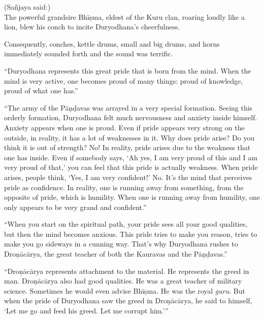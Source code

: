 {\hspace*{1em}(Sañjaya said:) \\
The powerful grandsire Bhīṣma, eldest of the Kuru clan, roaring loudly like a lion, blew his conch to incite Duryodhana's cheerfulness.}

{Consequently, conches, kettle drums, small and big drums, and horns immediately sounded forth and the sound was terrific.}


\enquote{Duryodhana represents this great pride that is born from the mind. When the mind is very active, one becomes proud of many things: proud of knowledge, proud of what one has.}

\enquote{The army of the Pāṇḍavas was arrayed in a very special formation. Seeing this orderly formation, Duryodhana felt much nervousness and anxiety inside himself. Anxiety appears when one is proud. Even if pride appears very strong on the outside, in reality, it has a lot of weaknesses in it. Why does pride arise? Do you think it is out of strength? No! In reality, pride arises due to the weakness that one has inside. Even if somebody says, \enquote{Ah yes, I am very proud of this and I am very proud of that,} you can feel that this pride is actually weakness. When pride arises, people think, \enquote{Yes, I am very confident!} No. It’s the mind that perceives pride as confidence. In reality, one is running away from something, from the opposite of pride, which is humility. When one is running away from humility, one only appears to be very grand and confident.}

\enquote{When you start on the spiritual path, your pride sees all your good qualities, but then the mind becomes anxious. This pride tries to make you reason, tries to make you go sideways in a cunning way. That’s why Duryodhana rushes to Droṇācārya, the great teacher of both the Kauravas and the Pāṇḍavas.}

\enquote{Droṇācārya represents attachment to the material. He represents the greed in man. Droṇācārya also had good qualities. He was a great teacher of military science. Sometimes he would even advise Bhīṣma. He was the royal \textit{guru}. But when the pride of Duryodhana saw the greed in Droṇācārya, he said to himself, \enquote{Let me go and feed his greed. Let me corrupt him.}}


